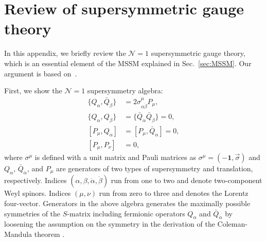 \documentclass[12pt,twoside,book]{article}
\begin{document}
\section{Review of supersymmetric gauge theory}
\label{sec:susy}

\vskip 0.1in

In this appendix, we briefly review the $\mathcal{N}=1$ supersymmetric gauge theory, which is an essential element of the MSSM explained in Sec.~\ref{sec:MSSM}.
Our argument is based on~\cite{Wess:320631, Martin:1997ns}.

First, we show the $\mathcal{N} = 1$ supersymmetry algebra: \cite{Haag:1974qh}
\begin{align}
  \{ Q_\alpha, \bar{Q}_{\dot{\beta}} \} &= 2 \sigma_{\alpha
  \dot{\beta}}^\mu P_\mu,\label{QQbar} \\
  \{ Q_\alpha, Q_\beta \} &= \{ \bar{Q}_{\dot{\alpha}}
  \bar{Q}_{\dot{\beta}} \}  = 0,\label{QQQbarQbar} \\
  [ P_\mu, Q_\alpha ] &= [ P_\mu, \bar{Q}_{\dot{\alpha}} ] =
  0,\label{PQPQbar}\\
  [ P_\mu, P_\nu ] &= 0,\label{PP}
\end{align}
where $\sigma^\mu$ is defined with a unit matrix and Pauli matrices as $\sigma^\mu = (-\textbf{1},\vec{\sigma})$ and $Q_\alpha$, $\bar{Q}_{\dot{\alpha}}$, and $P_\mu$ are generators of two types of supersymmetry and translation, respectively.
Indices $(\alpha,\beta,\dot{\alpha},\dot{\beta})$ run from one to two and denote two-component Weyl spinors.
Indices $(\mu,\nu)$ run from zero to three and denotes the Lorentz four-vector.
Generators in the above algebra generates the maximally possible symmetries of the $S$-matrix including fermionic operators $Q_\alpha$ and $\bar{Q}_{\dot{\alpha}}$ by loosening the assumption on the symmetry in the derivation of the Coleman-Mandula theorem \cite{Coleman:1967ad}.
\end{document}
